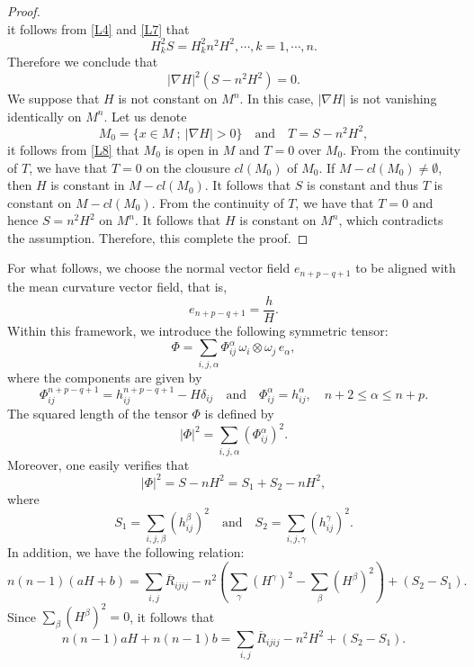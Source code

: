 \documentclass[leqno,11pt]{amsart}
\theoremstyle{plain}
\theoremstyle{definition}
\numberwithin{equation}{section}
\begin{document}
\begin{proof}
\begin{equation}
\end{equation}
it follows from \eqref{L4} and \eqref{L7} that
\begin{equation}
H^2_kS = H^2_k n^2H^2, \cdots, k=1,\cdots, n.
\end{equation}
Therefore we conclude that
\begin{equation}\label{L8}
|\nabla H|^2 (S - n^2H^2) = 0.    
\end{equation}
We suppose that $H$ is not constant on $M^n$. In this case, $|\nabla H|$ is not vanishing identically on $M^n$. Let us denote
$$
M_0 = \{ x \in M ~ ; ~ |\nabla H|> 0 \} \quad \text{and} \quad T = S - n^2H^2,
$$
it follows from \eqref{L8} that $M_0$ is open in $M$ and $T=0$ over $M_0$. From the continuity of $T$, we have that $T=0$ on the clousure $cl(M_0)$ of $M_0$. If $M - cl(M_0) \neq \emptyset$, then $H$ is constant in $M - cl(M_0)$. It follows that $S$ is constant and thus $T$ is constant on $M-cl(M_0)$. From the continuity of $T$, we have that $T=0$ and hence $S=n^2H^2$ on $M^n$. It follows that $H$ is constant on $M^n$, which contradicts the assumption. Therefore, this complete the proof.

\end{proof}



For what follows, we choose the normal vector field $e_{n+p-q+1}$ to be aligned with the mean curvature vector field, that is,
$$
e_{n+p-q+1} = \frac{h}{H}.
$$
Within this framework, we introduce the following symmetric tensor:
$$
\Phi = \sum_{i,j,\alpha} \Phi_{ij}^{\alpha} \, \omega_i \otimes \omega_j \, e_{\alpha},
$$
where the components are given by
$$
\Phi_{ij}^{n+p-q+1} = h_{ij}^{n+p-q+1} - H \delta_{ij}
\quad \text{and} \quad
\Phi_{ij}^{\alpha} = h_{ij}^{\alpha}, \quad n+2 \leq \alpha \leq n+p.
$$
The squared length of the tensor $\Phi$ is defined by
$$
|\Phi|^2 = \sum_{i,j,\alpha} \left( \Phi_{ij}^{\alpha} \right)^2.
$$
Moreover, one easily verifies that
$$
|\Phi|^2 = S - nH^2 = S_1 + S_2 - nH^2,
$$
where
$$
S_1 = \sum_{i,j,\beta} \left( h_{ij}^{\beta} \right)^2
\quad \text{and} \quad
S_2 = \sum_{i,j,\gamma} \left( h_{ij}^{\gamma} \right)^2.
$$
In addition, we have the following relation:
$$
n(n-1)(aH + b)
= \sum_{i,j} \overline{R}_{ijij}
- n^2 \left( \sum_{\gamma} (H^{\gamma})^2 - \sum_{\beta} (H^{\beta})^2 \right)
+ (S_2 - S_1).
$$
Since $\sum_{\beta} (H^{\beta})^2 = 0$, it follows that
\begin{equation}\label{eq:main_relation}
n(n-1)aH + n(n-1)b
= \sum_{i,j} \overline{R}_{ijij}
- n^2 H^2 + (S_2 - S_1).
\end{equation}
\end{document}
